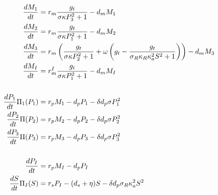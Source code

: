\documentclass[12pt]{article}
\begin{document}
\begin{align}
	\frac{dM_{1}}{dt} & =  r_m  \frac{ g_t}{\sigma\kappa P_3^2 + 1} - d_m  M_{1} \\
	\frac{dM_{2}}{dt} & =  r_m  \frac{ g_t}{\sigma\kappa P_1^2 + 1} - d_m  M_{2} \\
	\dfrac{dM_{3}}{dt} & =  r_m  \left(\frac{ g_t}{\sigma\kappa P_2^2 + 1} + \omega  \left(g_{t} - \frac{g_t}{\sigma_R \kappa_R \kappa_a^2 S^2 + 1}\right)\right) - d_m  M_{3} \\
	\frac{dM_{I}}{dt} & =  r_m^{I}  \frac{ g_t}{\sigma\kappa P_1^2 + 1}  - d_m  M_{I} \\
	\notag \\
	\dfrac{dP_1}{dt}\Pi_1(P_1) &= r_p M_{1} - d_p P_{1} - \delta d_p \sigma P_1^2 \\
	\dfrac{dP_2}{dt}\Pi(P_2) &= r_p M_{2} - d_p P_{2} - \delta d_p \sigma P_2^2 \\
	\dfrac{dP_3}{dt}\Pi(P_3) &= r_p M_{3} - d_p P_{3} - \delta d_p \sigma P_3^2 \\
	\notag \\
	\frac{dP_{I}}{dt} & =  r_p  M_{I} -d_p  P_{I} \\
	\dfrac{dS}{dt} \Pi_{I}(S) &= r_s P_{I} - (d_s + \eta) S - \delta d_p \sigma_R \kappa_a^2 S^2
\end{align}
\end{document}
